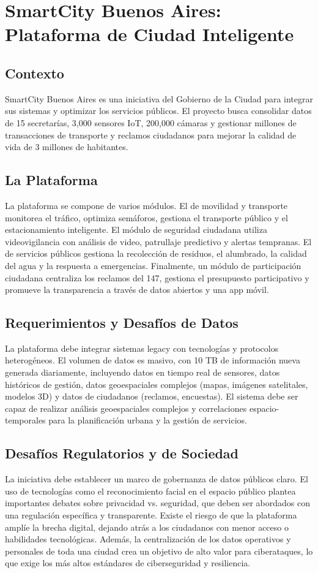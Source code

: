 \documentclass[12pt]{article}
\begin{document}
\newpage

\section{SmartCity Buenos Aires: Plataforma de Ciudad Inteligente}

\subsection{Contexto}
SmartCity Buenos Aires es una iniciativa del Gobierno de la Ciudad para integrar sus sistemas y optimizar los servicios públicos. El proyecto busca consolidar datos de 15 secretarías, 3,000 sensores IoT, 200,000 cámaras y gestionar millones de transacciones de transporte y reclamos ciudadanos para mejorar la calidad de vida de 3 millones de habitantes.

\subsection{La Plataforma}
La plataforma se compone de varios módulos. El de movilidad y transporte monitorea el tráfico, optimiza semáforos, gestiona el transporte público y el estacionamiento inteligente. El módulo de seguridad ciudadana utiliza videovigilancia con análisis de video, patrullaje predictivo y alertas tempranas. El de servicios públicos gestiona la recolección de residuos, el alumbrado, la calidad del agua y la respuesta a emergencias. Finalmente, un módulo de participación ciudadana centraliza los reclamos del 147, gestiona el presupuesto participativo y promueve la transparencia a través de datos abiertos y una app móvil.

\subsection{Requerimientos y Desafíos de Datos}
La plataforma debe integrar sistemas legacy con tecnologías y protocolos heterogéneos. El volumen de datos es masivo, con 10 TB de información nueva generada diariamente, incluyendo datos en tiempo real de sensores, datos históricos de gestión, datos geoespaciales complejos (mapas, imágenes satelitales, modelos 3D) y datos de ciudadanos (reclamos, encuestas). El sistema debe ser capaz de realizar análisis geoespaciales complejos y correlaciones espacio-temporales para la planificación urbana y la gestión de servicios.

\subsection{Desafíos Regulatorios y de Sociedad}
La iniciativa debe establecer un marco de gobernanza de datos públicos claro. El uso de tecnologías como el reconocimiento facial en el espacio público plantea importantes debates sobre privacidad vs. seguridad, que deben ser abordados con una regulación específica y transparente. Existe el riesgo de que la plataforma amplíe la brecha digital, dejando atrás a los ciudadanos con menor acceso o habilidades tecnológicas. Además, la centralización de los datos operativos y personales de toda una ciudad crea un objetivo de alto valor para ciberataques, lo que exige los más altos estándares de ciberseguridad y resiliencia.
\end{document}
